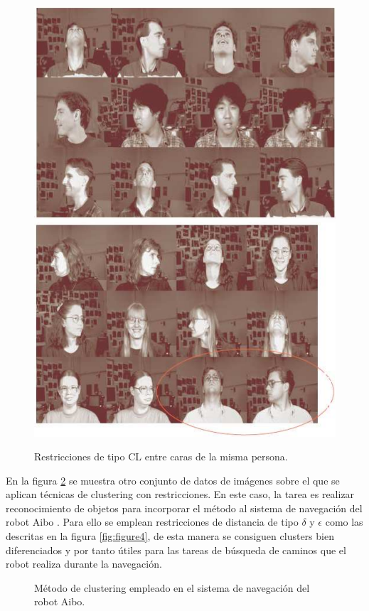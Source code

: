 \begin{figure}[bth]
	\myfloatalign
	{\includegraphics[width=.35\linewidth]{imagenes/c3/AnalisisImagenes/CarasDifOr1}} \quad
	{\includegraphics[width=.35\linewidth]{imagenes/c3/AnalisisImagenes/CarasDifOr2}}
	\caption{Restricciones de tipo \ac{CL} entre caras de la misma persona.  \cite{Survey:2007}}\label{fig:figure10}
\end{figure}

En la figura \ref{fig:figure11} se muestra otro conjunto de datos de imágenes sobre el que se aplican técnicas de clustering con restricciones. En este caso, la tarea es realizar reconocimiento de objetos para incorporar el método al sistema de navegación del robot Aibo \cite{DavidsonRavi:2005a}. Para ello se emplean restricciones de distancia de tipo $\delta$ y $\epsilon$ como las descritas en la figura \ref{fig:figure4}, de esta manera se consiguen clusters bien diferenciados y por tanto útiles para las tareas de búsqueda de caminos que el robot realiza durante la navegación.

\begin{figure}[bth]
	\myfloatalign
	 \quad
	 \quad
	 \quad
	\caption{Método de clustering empleado en el sistema de navegación del robot Aibo. \cite{Survey:2007}\cite{DavidsonRavi:2005a}}\label{fig:figure11}
\end{figure}

